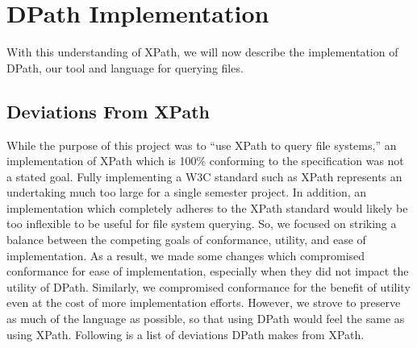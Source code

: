 \documentclass{scrartcl}
\begin{document}
\section{DPath Implementation}
\label{sec:dpath}

With this understanding of XPath, we will now describe the implementation of
DPath, our tool and language for querying files.

\subsection{Deviations From XPath}

While the purpose of this project was to ``use XPath to query file systems,'' an
implementation of XPath which is 100\% conforming to the specification was not a
stated goal. Fully implementing a W3C standard such as XPath represents an
undertaking much too large for a single semester project. In addition, an
implementation which completely adheres to the XPath standard would likely be
too inflexible to be useful for file system querying. So, we focused on
striking a balance between the competing goals of conformance, utility, and ease
of implementation. As a result, we made some changes which compromised
conformance for ease of implementation, especially when they did not impact the
utility of DPath. Similarly, we compromised conformance for the benefit of
utility even at the cost of more implementation efforts. However, we strove to
preserve as much of the language as possible, so that using DPath would feel the
same as using XPath. Following is a list of deviations DPath makes from XPath.
\end{document}
